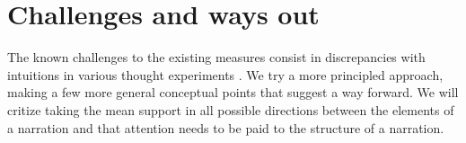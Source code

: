 \documentclass[10pt,]{scrartcl}
\begin{document}
















\section{Challenges and ways out}\label{sec:challenges}


The known challenges to the existing measures  consist in discrepancies with intuitions in various thought experiments \citep{Merricks1995,shogenji1999conducive, Akiba2000Shogenjis, Shogenji2001Reply, bovens2004bayesian,Siebel2004On-Fitelsons-me,siebel2006against,Shogenji2006Why,crupi2007BayesianMeasuresEvidential, koscholke2016evaluating, Schippers2019General}. We try a more principled approach,  making a few more general conceptual points that suggest a way forward. We will critize  taking the mean support in all possible directions between the elements of a narration and that attention needs to be paid to the structure of a narration.
\end{document}
